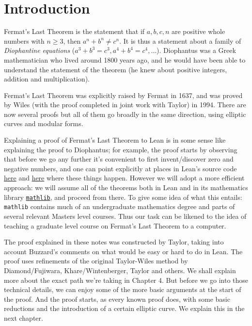\chapter{Introduction}

Fermat's Last Theorem is the statement that if $a,b,c,n$ are positive whole numbers with $n\geq 3$, then $a^n+b^n\not=c^n$. It is thus a statement about a family of \emph{Diophantine equations} ($a^3+b^3=c^3, a^4+b^4=c^4,\ldots$). Diophantus was a Greek mathematician who lived around 1800 years ago, and he would have been able to understand the statement of the theorem (he knew about positive integers, addition and multiplication).

Fermat's Last Theorem was explicitly raised by Fermat in 1637, and was proved by Wiles (with the proof completed in joint work with Taylor) in 1994. There are now several proofs but all of them go broadly in the same direction, using elliptic curves and modular forms.

Explaining a proof of Fermat's Last Theorem to Lean is in some sense like explaining the proof to Diophantus; for example, the proof starts by observing that before we go any further it's convenient to first invent/discover zero and negative numbers, and one can point explicitly at places in Lean's source code \href{https://github.com/leanprover/lean4/blob/260eaebf4e804c9ac1319532970544a4e157c336/src/Init/Prelude.lean#L1049}{here} and \href{https://github.com/leanprover/lean4/blob/260eaebf4e804c9ac1319532970544a4e157c336/src/Init/Data/Int/Basic.lean#L45}{here} where these things happen. However we will adopt a more efficient approach: we will assume all of the theorems both in Lean and in its mathematics library \href{https://github.com/leanprover-community/mathlib4}{\tt mathlib}, and proceed from there. To give some idea of what this entails: {\tt mathlib} contains much of an undergraduate mathematics degree and parts of several relevant Masters level courses. Thus our task can be likened to the idea of teaching a graduate level course on Fermat's Last Theorem to a computer.

The proof explained in these notes was constructed by Taylor, taking into account Buzzard's comments on what would be easy or hard to do in Lean. The proof uses refinements of the original Taylor-Wiles method by Diamond/Fujiwara, Khare/Wintenberger, Taylor and others. We shall explain more about the exact path we're taking in Chapter 4. But before we go into those technical details, we can enjoy some of the more basic arguments at the start of the proof. And the proof starts, as every known proof does, with some basic reductions and the introduction of a certain elliptic curve. We explain this in the next chapter.
